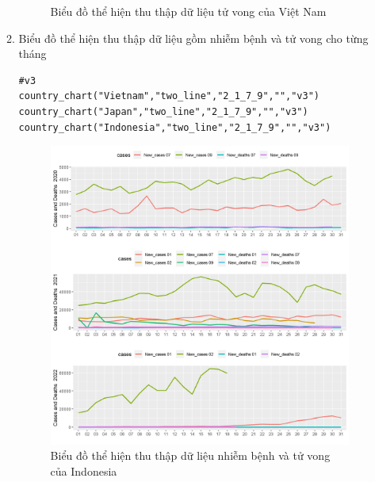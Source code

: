 \documentclass[a4paper]{article}
\theoremstyle{definition}
\begin{document}
\begin{enumerate}[i)]
\begin{enumerate}[1)]
\begin{figure}[htp]
		    \caption{Biểu đồ thể hiện thu thập dữ liệu tử vong của Việt Nam}
		    \label{fig:my_label}
		\end{figure}
    \newpage
    \item Biểu đồ thể hiện thu thập dữ liệu gồm nhiễm bệnh và tử vong cho từng tháng
    	\begin{lstlisting}[frame=single]  
#v3
country_chart("Vietnam","two_line","2_1_7_9","","v3")
country_chart("Japan","two_line","2_1_7_9","","v3")
country_chart("Indonesia","two_line","2_1_7_9","","v3")
		\end{lstlisting}	
		\begin{figure}[htp]
		    \centering
		    \includegraphics[scale = 0.7]{Images/V/v3 Indonesia .jpeg}
		    \caption{Biểu đồ thể hiện thu thập dữ liệu nhiễm bệnh và tử vong của Indonesia}
		    \label{fig:my_label}
		\end{figure}
		\begin{figure}[htp]
		    \centering

\end{figure}
\end{enumerate}
\end{enumerate}
\end{document}
